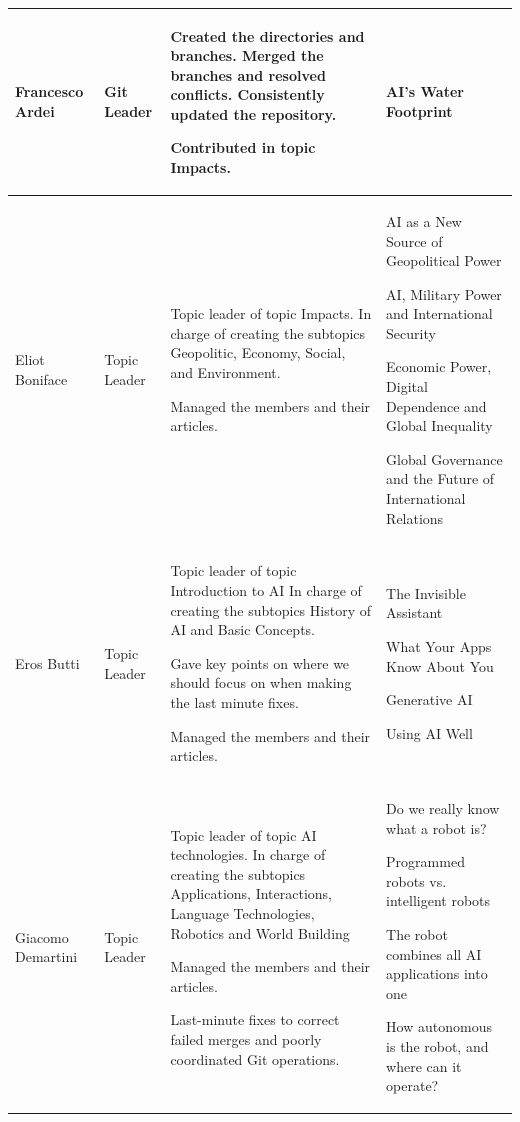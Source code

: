 \documentclass[11pt]{article}
\begin{document}
\begin{longtable} [c] {|p{3cm}|l|p{7cm}|p{4cm}|}
	Francesco Ardei & Git Leader & 
	\par \textbullet{} Created the directories and branches. Merged the branches and resolved conflicts. Consistently updated the repository.
	\par \textbullet{} Contributed in topic Impacts. &
	AI’s Water Footprint\\ 
	\hline
	
	Eliot Boniface & Topic Leader &
	\par \textbullet{} Topic leader of topic Impacts. In charge of creating the subtopics Geopolitic, Economy, Social, and Environment.
	\par \textbullet{} Managed the members and their articles. &
	\par \textbullet{} AI as a New Source of Geopolitical Power
	\par \textbullet{} AI, Military Power and International Security
	\par \textbullet{} Economic Power, Digital Dependence and Global Inequality
	\par \textbullet{} Global Governance and the Future of International Relations\\ 
	\hline
	
	Eros Butti & Topic Leader &
	\par \textbullet{} Topic leader of topic Introduction to AI In charge of creating the subtopics History of AI and Basic Concepts.
	\par \textbullet{}  Gave key points on where we should focus on when making the last minute fixes.
	\par \textbullet{} Managed the members and their articles. &
	\par \textbullet{} The Invisible Assistant
	\par \textbullet{} What Your Apps Know About You
	\par \textbullet{} Generative AI
	\par \textbullet{} Using AI Well \\ 
	\hline
	
	Giacomo Demartini & Topic Leader & 
	\par \textbullet{} Topic leader of topic AI technologies. In charge of creating the subtopics Applications, Interactions, Language Technologies, Robotics and World Building
	\par \textbullet{} Managed the members and their articles.
	\par \textbullet{}  Last-minute fixes to correct failed merges and poorly coordinated Git operations.&
	\par \textbullet{} Do we really know what a robot is?
	\par \textbullet{} Programmed robots vs. intelligent robots
	\par \textbullet{} The robot combines all AI applications into one
	\par \textbullet{} How autonomous is the robot, and where can it operate? \\ 
	\hline
	

\end{longtable}
\end{document}
